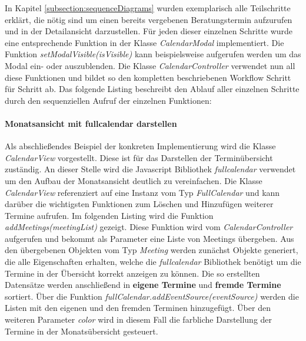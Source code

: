 In Kapitel \ref{subsection:sequenceDiagrams} wurden exemplarisch alle Teilschritte erklärt, die nötig sind um einen bereits vergebenen Beratungstermin aufzurufen und in der Detailansicht darzustellen. Für jeden dieser einzelnen Schritte wurde eine entsprechende Funktion in der Klasse \textit{CalendarModal} implementiert. Die Funktion \textit{setModalVisible(isVisible)} kann beispielsweise aufgerufen werden um das Modal ein- oder auszublenden. Die Klasse \textit{CalendarController} verwendet nun all diese Funktionen und bildet so den kompletten beschriebenen Workflow Schritt für Schritt ab. Das folgende Listing beschreibt den Ablauf aller einzelnen Schritte durch den sequenziellen Aufruf der einzelnen Funktionen:



\paragraph{Monatsansicht mit fullcalendar darstellen}

Als abschließendes Beispiel der konkreten Implementierung wird die Klasse \textit{CalendarView} vorgestellt. Diese ist für das Darstellen der Terminübersicht zuständig. An dieser Stelle wird die Javascript Bibliothek \textit{fullcalendar}\cite{fullCalendarWeb} verwendet um den Aufbau der Monatsansicht deutlich zu vereinfachen. Die Klasse \textit{CalendarView} referenziert auf eine Instanz vom Typ \textit{FullCalendar} und kann darüber die wichtigsten Funktionen zum Löschen und Hinzufügen weiterer Termine aufrufen.
Im folgenden Listing wird die Funktion \textit{addMeetings(meetingList)} gezeigt. Diese Funktion wird vom \textit{CalendarController} aufgerufen und bekommt als Parameter eine Liste von Meetings übergeben. Aus den übergebenen Objekten vom Typ \textit{Meeting} werden zunächst Objekte generiert, die alle Eigenschaften erhalten, welche die \textit{fullcalendar} Bibliothek benötigt um die Termine in der Übersicht korrekt anzeigen zu können. Die so erstellten Datensätze werden anschließend in \textbf{eigene Termine} und \textbf{fremde Termine} sortiert. Über die Funktion \textit{fullCalendar.addEventSource(eventSource)} werden die Listen mit den eigenen und den fremden Terminen hinzugefügt. Über den weiteren Parameter \textit{color} wird in diesem Fall die farbliche Darstellung der Termine in der Monatsübersicht gesteuert.


    
